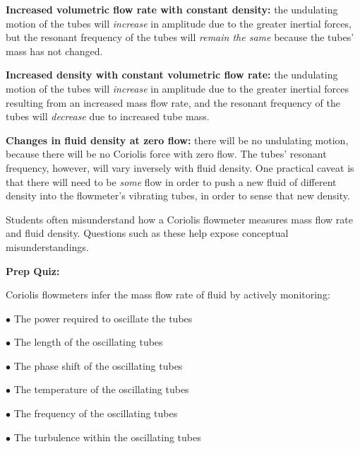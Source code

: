 
{\bf Increased volumetric flow rate with constant density:} the undulating motion of the tubes will {\it increase} in amplitude due to the greater inertial forces, but the resonant frequency of the tubes will {\it remain the same} because the tubes' mass has not changed.

\vskip 10pt

{\bf Increased density with constant volumetric flow rate:} the undulating motion of the tubes will {\it increase} in amplitude due to the greater inertial forces resulting from an increased mass flow rate, and the resonant frequency of the tubes will {\it decrease} due to increased tube mass.

\vskip 10pt

{\bf Changes in fluid density at zero flow:} there will be no undulating motion, because there will be no Coriolis force with zero flow.  The tubes' resonant frequency, however, will vary inversely with fluid density.  One practical caveat is that there will need to be {\it some} flow in order to push a new fluid of different density into the flowmeter's vibrating tubes, in order to sense that new density.







Students often misunderstand how a Coriolis flowmeter measures mass flow rate and fluid density.  Questions such as these help expose conceptual misunderstandings.










\vfil \eject

\noindent
{\bf Prep Quiz:}

Coriolis flowmeters infer the mass flow rate of fluid by actively monitoring:

\medskip
\item{$\bullet$} The power required to oscillate the tubes
\vskip 5pt 
\item{$\bullet$} The length of the oscillating tubes
\vskip 5pt 
\item{$\bullet$} The phase shift of the oscillating tubes
\vskip 5pt 
\item{$\bullet$} The temperature of the oscillating tubes
\vskip 5pt 
\item{$\bullet$} The frequency of the oscillating tubes
\vskip 5pt 
\item{$\bullet$} The turbulence within the oscillating tubes
\medskip











